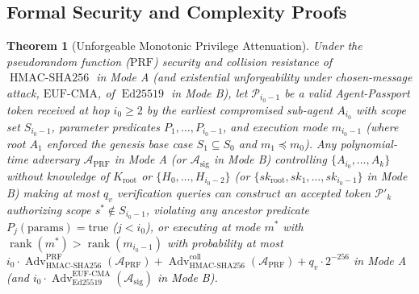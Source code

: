 \documentclass[conference,10pt]{IEEEtran}
\newtheorem{theorem}{Theorem}
\begin{document}
\subsection{Formal Security and Complexity Proofs}

\begin{theorem}[Unforgeable Monotonic Privilege Attenuation]
\label{thm:monotonic}
Under the pseudorandom function ($\text{PRF}$) security and collision resistance of $\operatorname{HMAC-SHA256}$ in Mode A (and existential unforgeability under chosen-message attack, $\text{EUF-CMA}$, of $\operatorname{Ed25519}$ in Mode B), let $\mathcal{P}_{i_0-1}$ be a valid Agent-Passport token received at hop $i_0 \ge 2$ by the earliest compromised sub-agent $A_{i_0}$ with scope set $S_{i_0-1}$, parameter predicates $P_1, \dots, P_{i_0-1}$, and execution mode $m_{i_0-1}$ (where root $A_1$ enforced the genesis base case $S_1 \subseteq S_0$ and $m_1 \preceq m_0$). Any polynomial-time adversary $\mathcal{A}_{\text{PRF}}$ in Mode A (or $\mathcal{A}_{\text{sig}}$ in Mode B) controlling $\{A_{i_0}, \dots, A_k\}$ without knowledge of $K_{\text{root}}$ or $\{H_0, \dots, H_{i_0-2}\}$ (or $\{sk_{\text{root}}, sk_1, \dots, sk_{i_0-1}\}$ in Mode B) making at most $q_v$ verification queries can construct an accepted token $\mathcal{P}'_k$ authorizing scope $s^* \notin S_{i_0-1}$, violating any ancestor predicate $P_j(\text{params}) = \text{true}$ ($j < i_0$), or executing at mode $m^*$ with $\operatorname{rank}(m^*) > \operatorname{rank}(m_{i_0-1})$ with probability at most $i_0 \cdot \operatorname{Adv}^{\text{PRF}}_{\operatorname{HMAC-SHA256}}(\mathcal{A}_{\text{PRF}}) + \operatorname{Adv}^{\text{coll}}_{\operatorname{HMAC-SHA256}}(\mathcal{A}_{\text{PRF}}) + q_v \cdot 2^{-256}$ in Mode A (and $i_0 \cdot \operatorname{Adv}^{\text{EUF-CMA}}_{\operatorname{Ed25519}}(\mathcal{A}_{\text{sig}})$ in Mode B).
\end{theorem}
\end{document}
